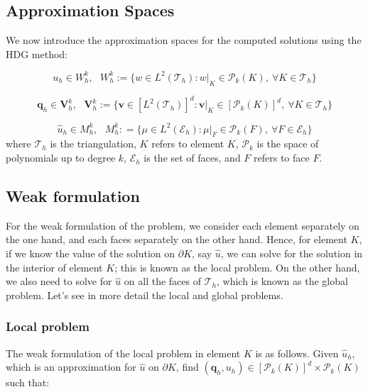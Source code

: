 \documentclass[10pt,a4paper]{article}
\begin{document}
\subsection*{Approximation Spaces}

We now introduce the approximation spaces for the computed solutions using the HDG method:

\begin{equation}
    u_h \in W_h^k,~~~W_h^k := \{w \in L^2(\mathcal{T}_h) : w|_K \in \mathcal{P}_k(K),~\forall K \in \mathcal{T}_h \}
\end{equation}

\begin{equation}
    \mathbf{q}_h \in \mathbf{V}_h^k,~~~\mathbf{V}_h^k := \{\mathbf{v} \in [L^2(\mathcal{T}_h)]^d : \mathbf{v}|_K \in [\mathcal{P}_k(K)]^d,~\forall K \in \mathcal{T}_h \}
\end{equation}

\begin{equation}
    \hat{u}_h \in M_h^k,~~~M_h^k : = \{\mu \in L^2(\mathcal{E}_h) : \mu|_F \in \mathcal{P}_k(F),~\forall F \in \mathcal{E}_h \}
\end{equation}
where $\mathcal{T}_h$ is the triangulation, $K$ refers to element $K$, $\mathcal{P}_k$ is the space of polynomials up to degree $k$,
$\mathcal{E}_h$ is the set of faces, and $F$ refers to face $F$.

\subsection*{Weak formulation}

For the weak formulation of the problem, we consider each element separately on the one hand, and each faces separately on the other hand. 
Hence, for element $K$, if we know the value of the solution on $\partial K$, say $\hat{u}$, we can solve for the solution in the interior of element $K$; this is known as the
local problem.
On the other hand, we also need to solve for $\hat{u}$ on all the faces of $\mathcal{T}_h$, which is known as the global problem.
Let's see in more detail the local and global problems.
\subsubsection*{Local problem}

The weak formulation of the local problem in element $K$ is as follows. 
Given $\hat{u}_h$, which is an approximation for $\hat{u}$ on $\partial K$, find $(\mathbf{q}_h,u_h) \in [\mathcal{P}_k(K)]^d \times \mathcal{P}_k(K)$ such that:
\end{document}
